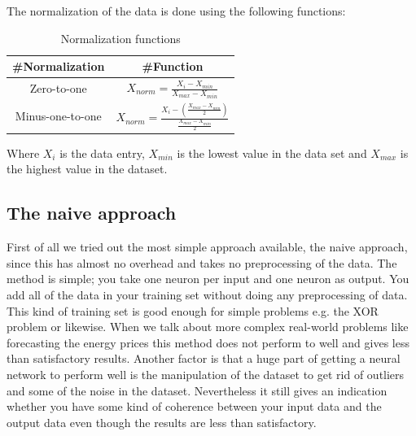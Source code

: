 The normalization of the data is done using the following functions:
\begin{table}[H]
\centering  %
\renewcommand{\arraystretch}{2}
\begin{tabular}{c c} %
 \#Normalization & \#Function \\ [0.5ex] %
\hline                  %
Zero-to-one & $ X_{norm} = \frac{X_i - X_{min}}{X_{max} - X_{min}}$ \\
Minus-one-to-one & $ X_{norm} = \frac{X_i - (\frac{X_{max} - X_{min}}{2})}{\frac{X_{max} - X_{min}}{2}}$ \\
[1ex]
\hline %
\end{tabular}
\caption{Normalization functions} %
\label{table:naiveTrainingApproach} %
\end{table}
Where $X_i$ is the data entry, $X_{min}$ is the lowest value in the data set and $X_{max}$ is the highest value in the dataset.

\subsection{The naive approach}
First of all we tried out the most simple approach available, the naive approach, since this has almost no overhead and takes no preprocessing of the data. The method is simple; you take one neuron per input and one neuron as output. You add all of the data in your training set without doing any preprocessing of data. This kind of training set is good enough for simple problems e.g. the XOR problem or likewise. When we talk about more complex real-world problems like forecasting the energy prices this method does not perform to well and gives less than satisfactory results. Another factor is that a huge part of getting a neural network to perform well is the manipulation of the dataset to get rid of outliers and some of the noise in the dataset. Nevertheless it still gives an indication whether you have some kind of coherence between your input data and the output data even though the results are less than satisfactory. 

